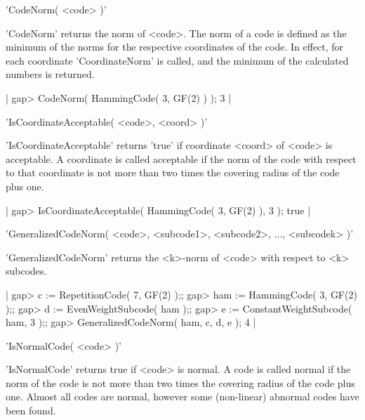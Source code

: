 
'CodeNorm( <code> )'

'CodeNorm' returns the norm of <code>.
The norm of a code is defined as
the minimum of the norms for the respective
coordinates of the code.
In effect, for each coordinate 'CoordinateNorm'
is called, and the minimum of the calculated 
numbers is returned.

|    gap> CodeNorm( HammingCode( 3, GF(2) ) );
    3 |




'IsCoordinateAcceptable( <code>, <coord> )'

'IsCoordinateAcceptable' returns 'true' if 
coordinate <coord> of <code> is acceptable.
A coordinate is called acceptable if the norm of
the code with respect to that coordinate is
not more than two times the covering radius of
the code plus one.

|    gap> IsCoordinateAcceptable( HammingCode( 3, GF(2) ), 3 );
    true |




'GeneralizedCodeNorm( <code>, <subcode1>, <subcode2>, ..., <subcodek> )'

'GeneralizedCodeNorm' returns the <k>-norm of <code> with
respect to <k> subcodes. 

|    gap> c := RepetitionCode( 7, GF(2) );;
    gap> ham := HammingCode( 3, GF(2) );;
    gap> d := EvenWeightSubcode( ham );;
    gap> e := ConstantWeightSubcode( ham, 3 );;
    gap> GeneralizedCodeNorm( ham, c, d, e );
    4 |




'IsNormalCode( <code> )'

'IsNormalCode' returns true if <code> is normal.
A code is called normal if the norm of the code is not more
than two times the covering radius of the code plus one.
Almost all codes are normal, however some (non-linear) abnormal
codes have been found.

